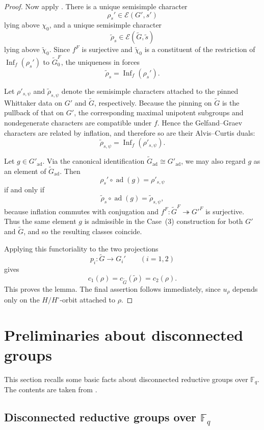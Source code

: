 \documentclass{amsart}
\theoremstyle{plain}
\numberwithin{equation}{section}
\theoremstyle{definition}
\newcommand{\cE}{\mathcal{E}}
\newcommand{\infl}{\operatorname{Inf}}
\newcommand{\ad}{\operatorname{ad}}
\begin{document}
\begin{proof}
Now apply \cite[Lem.~4.1(b)]{Malle2017}. There is a unique semisimple character
\[
\rho_s' \in \cE(G',s')
\]
lying above \(\chi_0\), and a unique semisimple character
\[
\widetilde\rho_s \in \cE(\widetilde G,\widetilde s)
\]
lying above \(\widetilde\chi_0\). Since \(f^F\) is surjective and \(\widetilde\chi_0\) is a constituent
of the restriction of \(\infl_f(\rho_s')\) to \(\widetilde G_0^F\), the uniqueness in
\cite[Lem.~4.1(b)]{Malle2017} forces
\[
\widetilde\rho_s=\infl_f(\rho_s').
\]

Let \(\rho'_{s,\psi}\) and \(\widetilde\rho_{s,\psi}\) denote the semisimple characters attached to the
pinned Whittaker data on \(G'\) and \(\widetilde G\), respectively. Because the pinning on
\(\widetilde G\) is the pullback of that on \(G'\), the corresponding maximal unipotent subgroups
and nondegenerate characters are compatible under \(f\). Hence the Gelfand--Graev characters are
related by inflation, and therefore so are their Alvis--Curtis duals:
\[
\widetilde\rho_{s,\psi}=\infl_f(\rho'_{s,\psi}).
\]

Let \(g\in G'_{\ad}\). Via the canonical identification \(\widetilde G_{\ad}\cong G'_{\ad}\), we may
also regard \(g\) as an element of \(\widetilde G_{\ad}\). Then
\[
\rho_s'\circ \ad(g)=\rho'_{s,\psi}
\]
if and only if
\[
\widetilde\rho_s\circ \ad(g)=\widetilde\rho_{s,\psi},
\]
because inflation commutes with conjugation and \(f^F:\widetilde G^F\twoheadrightarrow G'^F\) is
surjective. Thus the same element \(g\) is admissible in the Case~\textup{(3)} construction for
both \(G'\) and \(\widetilde G\), and so the resulting classes coincide.

Applying this functoriality to the two projections
\[
p_i:\widetilde G\to G_i'
\qquad (i=1,2)
\]
gives
\[
c_1(\rho)=c_{\widetilde G}(\widetilde\rho)=c_2(\rho).
\]
This proves the lemma. The final assertion follows immediately, since \(u_\rho\) depends only on the
\(H/H^\circ\)-orbit attached to \(\rho\).
\end{proof}

\section{Preliminaries about disconnected groups}
This section recalls some basic facts about disconnected reductive groups over \(\mathbb{F}_q\). The contents are taken from \cite{Bonnafe1999Produit}.
\medskip
\subsection{Disconnected reductive groups over $\mathbb{F}_q$}
\label{subsec:disc-red}
\end{document}
